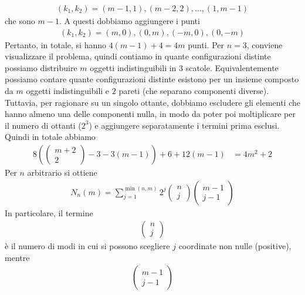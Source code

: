 \documentclass[twoside, 11pt]{amsbook}
\makeatletter
\newcommand{\0}{{(0)}}
\newcommand{\3}{{(3)}}
\theoremstyle{colonplain}
\theoremstyle{colondefinition}
\theoremstyle{colonremark}
\numberwithin{equation}{chapter}
\renewcommand{\proofname}{Dimostrazione}
\renewenvironment{proof}[1][\proofname]{\par
  \pushQED{\qed}%
  \normalfont \topsep6\p@\@plus6\p@\relax
  \trivlist
  \item[\hskip\labelsep\bfseries #1:]\ignorespaces
}{%
  \popQED\endtrivlist\@endpefalse
}
\makeatother
\begin{document}
\begin{proof}
\begin{align}
    (k_1, k_2) = (m - 1, 1), (m - 2, 2), \dots, (1, m - 1)
\end{align}
che sono $m - 1$. A questi dobbiamo aggiungere i punti
\begin{align}
    (k_1, k_2) = (m, 0), (0, m), (-m, 0), (0, -m)
\end{align}
Pertanto, in totale, si hanno $4(m - 1) + 4 = 4m$ punti. Per $n = 3$, conviene visualizzare il problema, quindi contiamo in quante configurazioni distinte possiamo distribuire $m$ oggetti indistinguibili in $3$ scatole. Equivalentemente possiamo contare quante configurazioni distinte esistono per un insieme composto da $m$ oggetti indistinguibili e $2$ pareti (che separano componenti diverse). Tuttavia, per ragionare su un singolo ottante, dobbiamo escludere gli elementi che hanno almeno una delle componenti nulla, in modo da poter poi moltiplicare per il numero di ottanti ($2^3$) e aggiungere separatamente i termini prima esclusi. Quindi in totale abbiamo
\begin{align}
    8\left(\begin{pmatrix}
        m + 2 \\
        2
    \end{pmatrix} - 3 - 3(m - 1)\right) + 6 + 12(m - 1) &= 4m^2 + 2
\end{align}
Per $n$ arbitrario si ottiene
\begin{align}
    N_n(m) = \sum_{j = 1}^{\min(n, m)} 2^j\begin{pmatrix}
        n \\
        j
    \end{pmatrix} \begin{pmatrix}
        m - 1 \\
        j - 1
    \end{pmatrix}
\end{align}
In particolare, il termine
\begin{align}
    \begin{pmatrix}
        n \\
        j
    \end{pmatrix}
\end{align}
è il numero di modi in cui si possono scegliere $j$ coordinate non nulle (positive), mentre
\begin{align}
    \begin{pmatrix}
        m - 1 \\
        j - 1
    \end{pmatrix}
\end{align}

\end{proof}
\end{document}
